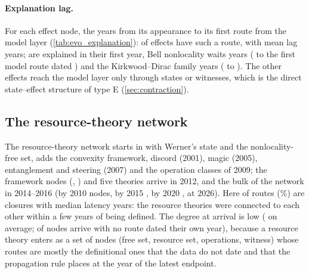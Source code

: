 \paragraph{Explanation lag.} For each effect node, the years from its appearance to its first route from the model layer (\cref{tab:evo_explanation}): \EgptEffectsWithM{} of \EgptEffects{} effects have such a route, with mean lag \EgptLagMean{} years; \EgptLagZero{} are explained in their first year, Bell nonlocality waits \EgptLagBell{} years (\EgptBellYear{} to the first model route dated \EgptBellFirstM{}) and the Kirkwood--Dirac family \EgptLagKD{} years (\EgptKDYear{} to \EgptKDFirstM{}). The other \EgptEffectsNoM{} effects reach the model layer only through states or witnesses, which is the direct state--effect structure of type E (\cref{sec:contraction}).

\begin{table}[htbp]\centering\small
\caption{Witness--effect pairs of the nonclassicality network with the year of each member and of the pairing route.}\label{tab:evo_witness}

\end{table}

\begin{table}[htbp]\centering\small
\caption{Explanation lag of the effect nodes of the nonclassicality network: year of the effect, year of its first route from a model node and from a state node, and the lags.}\label{tab:evo_explanation}

\end{table}

\subsection{The resource-theory network}
The resource-theory network starts in \EQRTYZero{} with Werner's state and the nonlocality-free set, adds the convexity framework, discord (2001), magic (2005), entanglement and steering (2007) and the operation classes of 2009; the framework nodes (, ) and five theories arrive in 2012, and the bulk of the network in 2014--2016 (by 2010 \EQRTVAtTwoZeroOneZero{} nodes, by 2015 \EQRTVAtTwoZeroOneFive{}, by 2020 \EQRTVAtTwoZeroTwoZero{}, \EQRTVfin{} at 2026). Here \EQRTClosures{} of \EQRTEfin{} routes (\EQRTClosureFrac\%) are closures with median latency \EQRTLatMedian{} years: the resource theories were connected to each other within a few years of being defined. The degree at arrival is low (\EQRTMeanArrDeg{} on average; \EQRTArrDegZero{} of \EQRTVfin{} nodes arrive with no route dated their own year), because a resource theory enters as a set of nodes (free set, resource set, operations, witness) whose routes are mostly the definitional ones that the data do not date and that the propagation rule places at the year of the latest endpoint.

